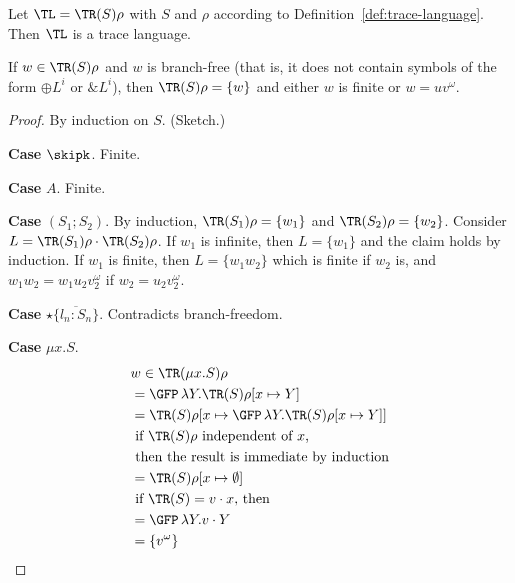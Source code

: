 \begin{lemma}
  Let ${\TL} = \TR (S) \rho$ with $S$ and $\rho$ according to Definition~\ref{def:trace-language}. Then
  ${\TL}$ is a trace language.
\end{lemma}
\begin{lemma}
  If $w \in \TR (S) \rho$ and $w$ is branch-free (that is, it does not contain symbols of the form
  $\oplus L^i$ or $\& L^i$), then $\TR (S)\rho = \{w\}$ and either $w$ is finite or $w=  uv^\omega$.
\end{lemma}
\begin{proof}
  By induction on $S$. (Sketch.)

  \textbf{Case }$\skipk$. Finite.

  \textbf{Case }$A$. Finite.

  \textbf{Case }$(S_1;S_2)$. By induction, $\TR (S_1)\rho = \{w_1\}$ and $\TR (S_2)\rho =
  \{w_2\}$. Consider $L = \TR (S_1)\rho \cdot \TR (S_2) \rho$. If $w_1$ is infinite, then $L = \{
  w_1\}$ and the claim holds by induction. If $w_1$ is finite, then $L = \{ w_1w_2 \}$ which is
  finite if $w_2$ is, and $w_1w_2 = w_1 u_2v_2^\omega$ if $w_2=u_2v_2^\omega$.

  \textbf{Case }$\star\{\overline{l_n:S_n}\}$. Contradicts branch-freedom.

  \textbf{Case }$\mu x.S$.
  \begin{align*}
    & w \in \TR (\mu x.S) \rho \\
    & = \GFP\, \lambda Y.\TR (S)\rho[x \mapsto Y] \\
    & = \TR (S) \rho[x \mapsto \GFP\, \lambda Y.\TR (S)\rho[x \mapsto Y]] \\
    & \text{ if $\TR( S)\rho$ independent of $x$,}\\
    & \text{ then the result is immediate by induction} \\
    & = \TR (S) \rho[x \mapsto \emptyset] \\
    & \text{ if $\TR (S) = v\cdot x$, then} \\
    & = \GFP\, \lambda Y.v \cdot Y \\
    & = \{ v^\omega \}
  \end{align*}


\end{proof}

